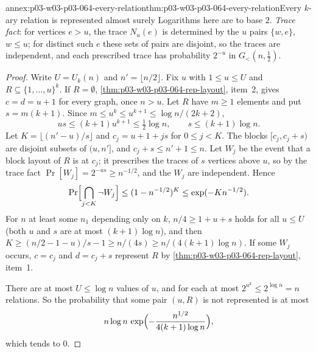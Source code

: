 \begin{annexitem}{annex:p03-w03-p03-064-every-relation}{thm:p03-w03-p03-064-every-relation}{Every \(k\)-ary relation is represented almost surely}
Logarithms here are to base \(2\).  \emph{Trace fact}: for vertices
\(e>u\), the trace \(N_u(e)\) is determined by the \(u\) pairs \(\{w,e\}\),
\(w\leq u\); for distinct such \(e\) these sets of pairs are disjoint, so the
traces are independent, and each prescribed trace has probability \(2^{-u}\)
in \(G_<(n,\frac12)\).
\begin{proof}
Write \(U=U_k(n)\) and \(n'=\lfloor n/2\rfloor\).  Fix \(u\) with
\(1\leq u\leq U\) and \(R\subseteq\{1,\ldots,u\}^k\).  If \(R=\emptyset\),
\cref{thm:p03-w03-p03-064-rep-layout}, item~2, gives \(c=d=u+1\) for every
graph, once \(n>u\).  Let \(R\) have \(m\geq1\) elements and put
\(s=m(k+1)\).  Since \(m\leq u^k\leq u^{k+1}\leq\log n/(2k+2)\),
\[
  us\leq(k+1)u^{k+1}\leq\tfrac12\log n,\qquad s\leq(k+1)\log n .
\]
Let \(K=\lfloor(n'-u)/s\rfloor\) and \(c_j=u+1+js\) for \(0\leq j<K\).  The
blocks \([c_j,c_j+s)\) are disjoint subsets of \((u,n']\), and
\(c_j+s\leq n'+1\leq n\).  Let \(W_j\) be the event that a block layout of
\(R\) is at \(c_j\); it prescribes the traces of \(s\) vertices above \(u\),
so by the trace fact \(\Pr[W_j]=2^{-us}\geq n^{-1/2}\), and the \(W_j\) are
independent.  Hence
\[
  \Pr\Bigl[\bigcap_{j<K}\neg W_j\Bigr]\leq(1-n^{-1/2})^K\leq\exp(-Kn^{-1/2}).
\]
For \(n\) at least some \(n_1\) depending only on \(k\),
\(n/4\geq1+u+s\) holds for all \(u\leq U\) (both \(u\) and \(s\) are at most
\((k+1)\log n\)), and then \(K\geq(n/2-1-u)/s-1\geq n/(4s)\geq
n/(4(k+1)\log n)\).  If some \(W_j\) occurs, \(c=c_j\) and \(d=c_j+s\)
represent \(R\) by \cref{thm:p03-w03-p03-064-rep-layout}, item~1.

There are at most \(U\leq\log n\) values of \(u\), and for each at most
\(2^{u^k}\leq2^{\log n}=n\) relations.  So the probability that some pair
\((u,R)\) is not represented is at most
\[
  n\log n\,\exp\Bigl(-\frac{n^{1/2}}{4(k+1)\log n}\Bigr),
\]
which tends to \(0\).
\end{proof}
\end{annexitem}


